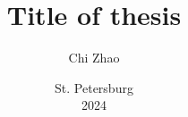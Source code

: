 \documentclass[hidelinks,fontsize=14pt,paper=a4,pagesize,DIV=calc,noenddot]{gost}
\author{Chi Zhao}
\date{St. Petersburg \\ 2024}
\title{Title of thesis}
\begin{document}
\maketitlepage
\tableofcontents













\end{document}
